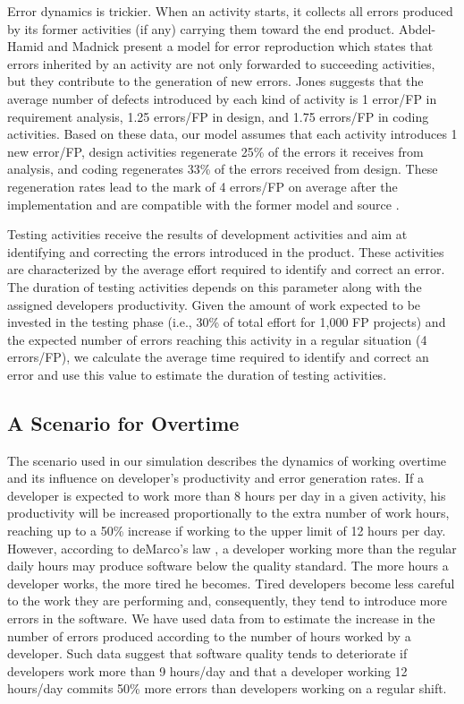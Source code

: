 \documentclass[conference]{IEEEtran}
\begin{document}
Error dynamics is trickier. When an activity starts, it collects all errors produced by its former activities (if any) carrying them toward the end product. Abdel-Hamid and Madnick \cite{Abdel-Hamid:1991} present a model for error reproduction which states that errors inherited by an activity are not only forwarded to succeeding activities, but they contribute to the generation of new errors. Jones \cite{Jones:2000} suggests that the average number of defects introduced by each kind of activity is 1 error/FP in requirement analysis, 1.25 errors/FP in design, and 1.75 errors/FP in coding activities. Based on these data, our model assumes that each activity introduces 1 new error/FP, design activities regenerate 25\% of the errors it receives from analysis, and coding regenerates 33\% of the errors received from design. These regeneration rates lead to the mark of 4 errors/FP on average after the implementation and are compatible with the former model \cite{Abdel-Hamid:1991} and source \cite{Jones:2000}.

Testing activities receive the results of development activities and aim at identifying and correcting the errors introduced in the product. These activities are characterized by the average effort required to identify and correct an error. The duration of testing activities depends on this parameter along with the assigned developers productivity. Given the amount of work expected to be invested in the testing phase \cite{Jones:2000} (i.e., 30\% of total effort for 1,000 FP projects) and the expected number of errors reaching this activity in a regular situation (4 errors/FP), we calculate the average time required to identify and correct an error and use this value to estimate the duration of testing activities.

\subsection{A Scenario for Overtime}

The scenario used in our simulation describes the dynamics of working overtime and its influence on developer's productivity and error generation rates. If a developer is expected to work more than 8 hours per day in a given activity, his productivity will be increased proportionally to the extra number of work hours, reaching up to a 50\% increase if working to the upper limit of 12 hours per day. However, according to deMarco's law \cite{demarco:1999}, a developer working more than the regular daily hours may produce software below the quality standard. The more hours a developer works, the more tired he becomes. Tired developers become less careful to the work they are performing and, consequently, they tend to introduce more errors in the software. We have used data from \cite{Abdel-Hamid:1991}  to estimate the increase in the number of errors produced according to the number of hours worked by a developer. Such data suggest that software quality tends to deteriorate if developers work more than 9 hours/day and that a developer working 12 hours/day commits 50\% more errors than developers working on a regular shift.
\end{document}
